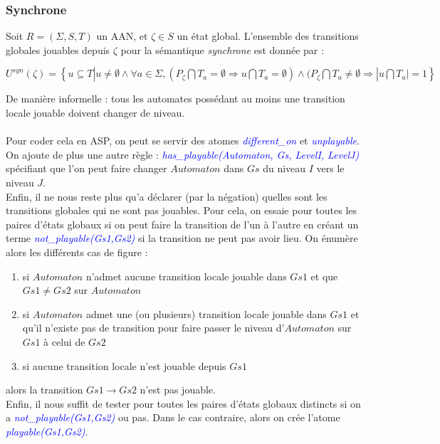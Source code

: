 \documentclass[12pt,a4paper]{article}
\begin{document}
\subsubsection{Synchrone}
Soit $R = (\Sigma,S,T)$ un AAN, et $\zeta\in S$ un état global. L'ensemble des transitions globales jouables depuis $\zeta$ pour la sémantique \emph{synchrone} est donnée par :
\begin{center}
	$U^{syn}(\zeta)=\left\{u\subseteq T|u \neq \emptyset \wedge \forall a\in\Sigma,(P_{\zeta}\bigcap T_a = \emptyset \Rightarrow u\bigcap 
	T_a=\emptyset)\wedge(P_{\zeta}\bigcap T_a\neq\emptyset\Rightarrow |u\bigcap T_a |=1\right\}$
\end{center}
De manière informelle : tous les automates possédant au moins une transition locale jouable doivent changer de niveau.\\ \\
Pour coder cela en ASP, on peut se servir des atomes \emph{\textcolor{blue}{different\_on}} et \emph{\textcolor{blue}{unplayable}}.\\
On ajoute de plus une autre règle : \emph{\textcolor{blue}{has\_playable(Automaton, Gs, LevelI, LevelJ)}} spécifiant que l'on peut faire changer $Automaton$ dans $Gs$ du niveau $I$ vers le niveau $J$.\\
Enfin, il ne nous reste plus qu'a déclarer (par la négation) quelles sont les transitions globales qui ne sont pas jouables. Pour cela, on essaie pour toutes les paires d'états globaux si on peut faire la transition de l'un à 
l'autre en créant un terme \emph{\textcolor{blue}{not\_playable(Gs1,Gs2)}} si la transition ne peut pas avoir lieu. On énumère alors les différents cas de figure :
\begin{enumerate}
	\item si $Automaton$ n'admet aucune transition locale jouable dans $Gs1$ et que $Gs1\neq Gs2$ sur $Automaton$
	\item si $Automaton$ admet une (ou plusieurs) transition locale jouable dans $Gs1$ et qu'il n'existe pas de transition pour faire passer le niveau d'$Automaton$ sur $Gs1$ à celui de $Gs2$
	\item si aucune transition locale n'est jouable depuis $Gs1$
\end{enumerate}
alors la transition $Gs1\rightarrow Gs2$ n'est pas jouable.\\
Enfin, il nous suffit de tester pour toutes les paires d'états globaux distincts si on a \emph{\textcolor{blue}{not\_playable(Gs1,Gs2)}} ou pas. Dans le cas contraire, alors on crée l'atome 
\emph{\textcolor{blue}{playable(Gs1,Gs2)}}.
\end{document}
